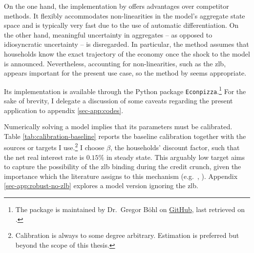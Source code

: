 \documentclass[a4paper,12pt]{article} %
\numberwithin{equation}{section} %
\numberwithin{figure}{section}
\numberwithin{table}{section}
\begin{document}
On the one hand, the implementation by \textcite{boehl2023econpizza} offers advantages over competitor methods. It flexibly accommodates non-linearities in the model's aggregate state space and is typically very fast due to the use of automatic differentiation. On the other hand, meaningful uncertainty in aggregates -- as opposed to idiosyncratic uncertainty -- is disregarded. In particular, the method assumes that households know the exact trajectory of the economy once the shock to the model is announced. Nevertheless, accounting for non-linearities, such as the \Gls{zlb}, appears important for the present use case, so the method by \textcite{boehl2023econpizza} seems appropriate.

Its implementation is available through the Python package \texttt{Econpizza}.\footnote{The package is maintained by Dr.~Gregor Böhl on \href{https://github.com/gboehl/econpizza}{GitHub}, last retrieved on .} For the sake of brevity, I delegate a discussion of some caveats regarding the present application to appendix \ref{sec-app:codes}.

Numerically solving a model implies that its parameters must be calibrated. Table \ref{tab:calibration-baseline} reports the baseline calibration together with the sources or targets I use.\footnote{Calibration is always to some degree arbitrary. Estimation is preferred but beyond the scope of this thesis.} I choose $\beta$, the households' discount factor, such that the net real interest rate is $0.15\%$ in steady state. This arguably low target aims to capture the possibility of the \Gls{zlb} binding during the credit crunch, given the importance which the literature assigns to this mechanism (e.g.~\cite{egg2012}, \cite{gl2017}). Appendix \ref{sec-app:robust-no-zlb} explores a model version ignoring the \Gls{zlb}.
\end{document}
